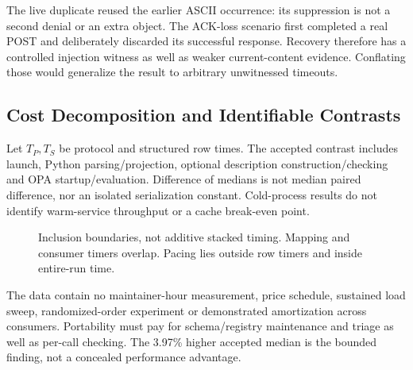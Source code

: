 \documentclass[11pt,letterpaper]{article}
\begin{document}
The live duplicate reused the earlier ASCII occurrence: its suppression is not
a second denial or an extra object. The ACK-loss scenario first completed a real
POST and deliberately discarded its successful response. Recovery therefore
has a controlled injection witness as well as weaker current-content evidence.
Conflating those would generalize the result to arbitrary unwitnessed timeouts.

\subsection{Cost Decomposition and Identifiable Contrasts}

Let $T_P,T_S$ be protocol and structured row times. The accepted contrast includes
launch, Python parsing/projection, optional description construction/checking and
OPA startup/evaluation. Difference of medians is not median paired difference,
nor an isolated serialization constant. Cold-process results do not identify
warm-service throughput or a cache break-even point.

\begin{figure}[tbp]
\centering
{}
\caption{Inclusion boundaries, not additive stacked timing. Mapping and consumer
timers overlap. Pacing lies outside row timers and inside entire-run time.}
\label{fig:cost}
\end{figure}

The data contain no maintainer-hour measurement, price schedule, sustained load
sweep, randomized-order experiment or demonstrated amortization across consumers.
Portability must pay for schema/registry maintenance and triage as well as
per-call checking. The 3.97\% higher accepted median is the bounded finding,
not a concealed performance advantage.
\end{document}
